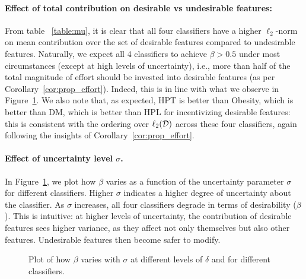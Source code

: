 \paragraph{Effect of total contribution on desirable vs undesirable features:} From table ~\ref{table:mu}, it is clear that all four classifiers have a higher $\ell_2$-norm on mean contribution over the set of desirable features compared to undesirable features. Naturally, we expect all 4 classifiers to achieve $\beta > 0.5$ under most circumstances (except at high levels of uncertainty), i.e., more than half of the total magnitude of effort should be invested into desirable features (as per Corollary~\ref{cor:prop_effort}). Indeed, this is in line with what we observe in Figure~\ref{fig:beta_vs_sigma}. We also note that, as expected, HPT is better than Obesity, which is better than DM, which is better than HPL for incentivizing desirable features: this is consistent with the ordering over $\ell_2(\mathcal{D})$ across these four classifiers, again following the insights of Corollary~\ref{cor:prop_effort}.     

\paragraph{Effect of uncertainty level $\sigma$.} In Figure~\ref{fig:beta_vs_sigma}, we plot how $\beta$ varies as a function of the uncertainty parameter $\sigma$ for different classifiers. Higher $\sigma$ indicates a higher degree of uncertainty about the classifier. As $\sigma$ increases, all four classifiers degrade in terms of desirability ($\beta$). This is intuitive: at higher levels of uncertainty, the contribution of desirable features sees higher variance, as they affect not only themselves but also other features. Undesirable features then become safer to modify.

\begin{figure}[!ht]
  \centering
  \hfill
  \hfill
  \par
  \caption{Plot of how $\beta$ varies with $\sigma$ at different levels of $\delta$ and for different classifiers. 
  } 
  \label{fig:beta_vs_sigma}
\end{figure}

